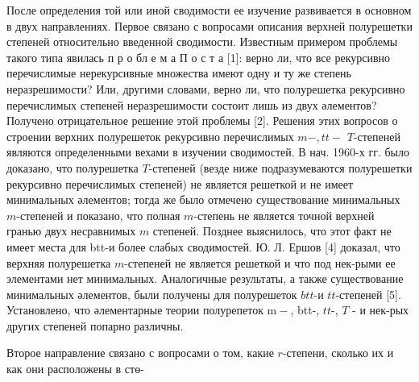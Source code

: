 \documentclass[10pt]{article}
\begin{document}
После определения той или иной сводимости ее изучение развивается в основном в двух направлениях. Первое связано с вопросами описания верхней полурешетки степеней относительно введенной сводимости. Известным примером проблемы такого типа явилась п р о бл е м а П о с т а [1]: верно ли, что все рекурсивно перечислимые нерекурсивные множества имеют одну и ту же степень неразрешимости? Или, другими словами, верно ли, что полурешетка рекурсивно перечислимых степеней неразрешимости состоит лишь из двух әлементов? Получено отрицательное решение этой проблемы [2]. Решения этих вопросов о строении верхних полурешеток рекурсивно перечислимых $m-, t t-$ $T$-степеней являются определенными вехами в изучении сводимостей. В нач. 1960-х гг. было доказано, что полурешетка $T$-степеней (везде ниже подразумеваются полурешетки рекурсивно перечислимых степеней) не является решеткой и не имеет минимальных әлементов; тогда же было отмечено существование минимальных $m$-степеней и показано, что полная $m$-степень не является точной верхней гранью двух несравнимых $m$ степеней. Позднее выяснилось, что этот факт не имеет места для btt-и более слабых сводимостей. Ю. Л. Ершов [4] доказал, что верхняя полурешетка $m$-степеней не является решеткой и что под нек-рыми ее элементами нет минимальных. Аналогичные результаты, а также существование минимальных әлементов, были получены для полурешеток $b t t$-и $t t$-степеней [5]. Установлено, что әлементарные теории полурепеток $\mathrm{m-}$, btt-, $t t$-, $T$ - и нек-рых других степеней попарно различны.



Второе направление связано с вопросами о том, какие $r$-степени, сколько их и как они расположены в стө-
\end{document}
